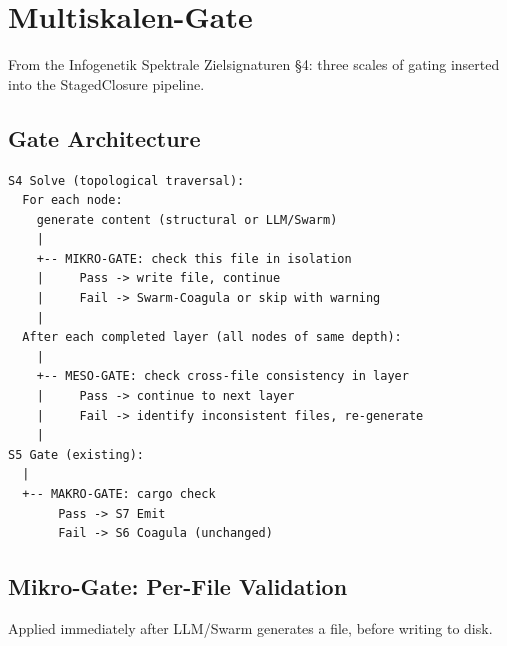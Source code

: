 \documentclass[11pt,a4paper]{article}
\begin{document}
\section{Multiskalen-Gate}
\label{sec:gates}

From the Infogenetik Spektrale Zielsignaturen \S4: three scales 
of gating inserted into the StagedClosure pipeline.

\subsection{Gate Architecture}

\begin{lstlisting}[style=bash]
S4 Solve (topological traversal):
  For each node:
    generate content (structural or LLM/Swarm)
    |
    +-- MIKRO-GATE: check this file in isolation
    |     Pass -> write file, continue
    |     Fail -> Swarm-Coagula or skip with warning
    |
  After each completed layer (all nodes of same depth):
    |
    +-- MESO-GATE: check cross-file consistency in layer
    |     Pass -> continue to next layer
    |     Fail -> identify inconsistent files, re-generate
    |
S5 Gate (existing):
  |
  +-- MAKRO-GATE: cargo check
       Pass -> S7 Emit
       Fail -> S6 Coagula (unchanged)
\end{lstlisting}

\subsection{Mikro-Gate: Per-File Validation}

Applied immediately after LLM/Swarm generates a file, before 
writing to disk.
\end{document}
